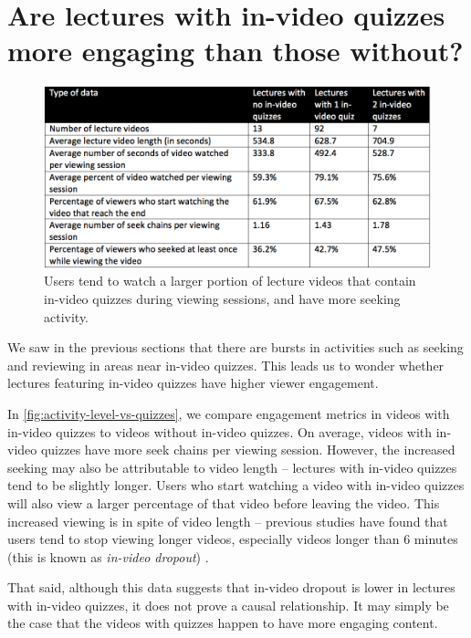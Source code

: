 \documentclass{sigchi}
\begin{document}
\pagebreak

\section{Are lectures with in-video quizzes more engaging than those without?}

\begin{figure}
\includegraphics[width=1.0\columnwidth]{activity-level-vs-quizzes}
\caption{Users tend to watch a larger portion of lecture videos that contain in-video quizzes during viewing sessions, and have more seeking activity.}
\label{fig:activity-level-vs-quizzes}
\end{figure}

We saw in the previous sections that there are bursts in activities such as seeking and reviewing in areas near in-video quizzes. This leads us to wonder whether lectures featuring in-video quizzes have higher viewer engagement.

In \autoref{fig:activity-level-vs-quizzes}, we compare engagement metrics in videos with in-video quizzes to videos without in-video quizzes. On average, videos with in-video quizzes have more seek chains per viewing session. However, the increased seeking may also be attributable to video length -- lectures with in-video quizzes tend to be slightly longer. Users who start watching a video with in-video quizzes will also view a larger percentage of that video before leaving the video. This increased viewing is in spite of video length -- previous studies have found that users tend to stop viewing longer videos, especially videos longer than 6 minutes (this is known as \textit{in-video dropout}) \cite{juho}.

That said, although this data suggests that in-video dropout is lower in lectures with in-video quizzes, it does not prove a causal relationship. It may simply be the case that the videos with quizzes happen to have more engaging content.
\end{document}
